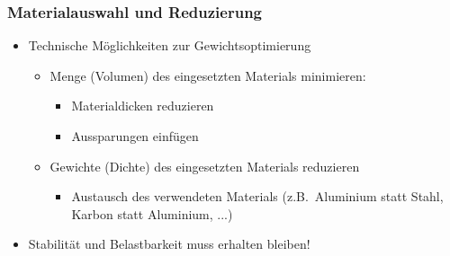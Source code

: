 \subsubsection{Materialauswahl und Reduzierung}
\begin{itemize}
	\item Technische Möglichkeiten zur Gewichtsoptimierung
	\begin{itemize}
		\item Menge (Volumen) des eingesetzten Materials minimieren:
		\begin{itemize}
			\item Materialdicken reduzieren
			\item Aussparungen einfügen
		\end{itemize}
		\item Gewichte (Dichte) des eingesetzten Materials reduzieren
		\begin{itemize}
			\item Austausch des verwendeten Materials (z.B.\ Aluminium statt Stahl, Karbon statt Aluminium, ...)
		\end{itemize}
	\end{itemize}
	\item Stabilität und Belastbarkeit muss erhalten bleiben!
\end{itemize}

